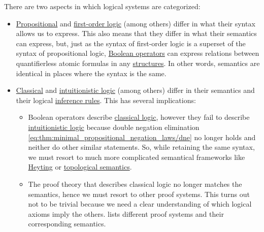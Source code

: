 There are two aspects in which logical systems are categorized:
\begin{itemize}
  \item \hyperref[subsec:propositional_logic]{Propositional} and \hyperref[subsec:first_order_logic]{first-order logic} (among others) differ in what their syntax allows us to express. This also means that they differ in what their semantics can express, but, just as the syntax of first-order logic is a superset of the syntax of propositional logic, \hyperref[subsec:boolean_operators]{Boolean operators} can express relations between quantifierless atomic formulas in any \hyperref[def:first_order_structure]{structures}. In other words, semantics are identical in places where the syntax is the same.

  \item \hyperref[rem:classical_logic]{Classical} and \hyperref[rem:intuitionistic_logic]{intuitionistic logic} (among others) differ in their semantics and their logical \hyperref[def:judgment/inference_rule]{inference rules}. This has several implications:
  \begin{itemize}
     \item Boolean operators describe \hyperref[rem:classical_logic]{classical logic}, however they fail to describe \hyperref[rem:intuitionistic_logic]{intuitionistic logic} because double negation elimination \eqref{eq:thm:minimal_propositional_negation_laws/dne} no longer holds and neither do other similar statements. So, while retaining the same syntax, we must resort to much more complicated semantical frameworks like \hyperref[def:propositional_heyting_algebra_semantics]{Heyting} or \hyperref[def:propositional_topological_semantics]{topological semantics}.

     \item The proof theory that describes classical logic no longer matches the semantics, hence we must resort to other proof systems. This turns out not to be trivial because we need a clear understanding of which logical axioms imply the others.  lists different proof systems and their corresponding semantics.
  \end{itemize}
\end{itemize}

